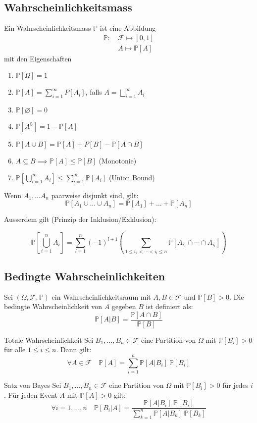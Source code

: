 \documentclass[a4paper,10pt]{article}
\def\P{\mathbb{P}}
\def\F{\mathcal{F}}
\begin{document}
\subsection{Wahrscheinlichkeitsmass}
Ein Wahrscheinlichkeitsmass \(\P\) ist eine Abbildung
\begin{align*}
	\P: \  & \F \mapsto \left[0,1\right] \\
	       & A \mapsto \P[A]
\end{align*}
mit den Eigenschaften
\begin{enumerate}
	\item \(\P[\Omega] = 1\)
	\item \(\P [A] = \sum_{i=1}^\infty P[A_i]\), falls \(A = \bigsqcup_{i=1}^\infty A_i\)
	\item \(\P[\varnothing] = 0\)
	\item \(\P[A^\complement] = 1 - \P[A]\)
	\item \(\P[A \cup B] = \P[A] + P[B] - \P[A\cap B]\)
	\item \(A \subseteq B \implies \P[A] \le \P[B]\) (Monotonie)
	\item \(\P[\bigcup_{i=1}^\infty A_i] \le \sum_{i=1}^\infty \P[A_i]\) (Union Bound)
\end{enumerate}

Wenn \(A_1, \ldots A_n\) paarweise disjunkt sind, gilt:
\[\P[A_1 \cup \ldots \cup A_n] = \P[A_1] + \ldots + \P[A_n]\]

Ausserdem gilt (Prinzip der Inklusion/Exklusion):

$$
	\P \left[ \bigcup_{i=1}^n A_i \right] = \sum_{l=1}^n (-1)^{l+1} \left( \sum_{1 \leq i_1 < \cdots < i_l \leq n} \P \left[ A_{i_1} \cap \cdots \cap A_{i_l} \right] \right)
$$

\subsection{Bedingte Wahrscheinlichkeiten}
Sei \((\Omega, \F, \P)\) ein Wahrscheinlichkeitsraum mit \(A, B \in \F\) und \(\P[B] > 0\). Die bedingte Wahrscheinlichkeit von \(A\) gegeben \(B\) ist definiert als:
\[\P[A|B] = \frac{\P[A\cap B]}{\P[B]}\]
\begin{subbox}{Totale Wahrscheinlichkeit}
	Sei \(B_1, \ldots, B_n \in \F\) eine Partition von \(\Omega\) mit \(\P[B_i] > 0\) für alle \(1 \le i \le n\). Dann gilt:
	\[\forall A \in \F \quad \P[A] = \sum_{i=1}^{n} \P[A|B_i] \ \P[B_i]\]
\end{subbox}
\begin{mainbox}{Satz von Bayes}
	Sei \(B_1, \ldots, B_n \in \F\) eine Partition von \(\Omega\) mit \(\P[B_i] > 0\) für jedes \(i\). Für jeden Event \(A\) mit \(\P[A] > 0\) gilt:
	\[\forall i = 1,\ldots, n \quad \P[B_i|A] = \frac{\P[A|B_i] \ \P[B_i]}{\sum_{k=1}^n \P[A|B_k] \ \P[B_k]}\]
\end{mainbox}
\end{document}
